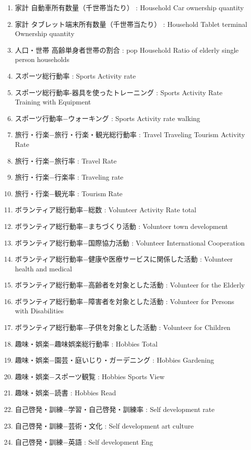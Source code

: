 \begin{multicols}{2}
\begin{enumerate}
  \item 家計 自動車所有数量（千世帯当たり）  :  Household Car ownership quantity
  \item 家計 タブレット端末所有数量（千世帯当たり）  :  Household Tablet terminal Ownership quantity
  \item 人口・世帯 高齢単身者世帯の割合  :  pop Household Ratio of elderly single person households
  \item スポーツ総行動率  :  Sports Activity rate
  \item スポーツ総行動率-器具を使ったトレーニング  :  Sports Activity Rate Training with Equipment
  \item スポーツ行動率−ウォーキング  :  Sports Activity rate walking
  \item 旅行・行楽−旅行・行楽・観光総行動率  :  Travel Traveling Tourism Activity Rate
  \item 旅行・行楽−旅行率  :  Travel Rate
  \item 旅行・行楽−行楽率  :  Traveling rate
  \item 旅行・行楽−観光率  :  Tourism Rate
  \item ボランティア総行動率−総数  :  Volunteer Activity Rate total
  \item ボランティア総行動率−まちづくり活動  :  Volunteer town development
  \item ボランティア総行動率−国際協力活動  :  Volunteer International Cooperation
  \item ボランティア総行動率−健康や医療サービスに関係した活動  :  Volunteer health and medical
  \item ボランティア総行動率−高齢者を対象とした活動  :  Volunteer for the Elderly
  \item ボランティア総行動率−障害者を対象とした活動  :  Volunteer for Persons with Disabilities
  \item ボランティア総行動率−子供を対象とした活動  :  Volunteer for Children
  \item 趣味・娯楽−趣味娯楽総行動率  :  Hobbies Total
  \item 趣味・娯楽−園芸・庭いじり・ガーデニング  :  Hobbies Gardening
  \item 趣味・娯楽−スポーツ観覧  :  Hobbies Sports View
  \item 趣味・娯楽−読書  :  Hobbies Read
  \item 自己啓発・訓練−学習・自己啓発・訓練率  :  Self development rate
  \item 自己啓発・訓練−芸術・文化  :  Self development art culture
  \item 自己啓発・訓練−英語  :  Self development Eng

\end{enumerate}
\end{multicols}
